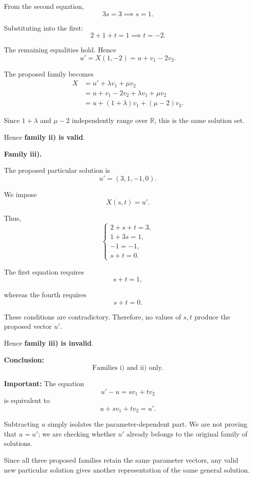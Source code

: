 \begin{enumerate}[label=\alph*)]
\begin{answer}
    From the second equation,
    $$
    3s=3
    \implies s=1.
    $$

    Substituting into the first:
    $$
    2+1+t=1
    \implies t=-2.
    $$

    The remaining equalities hold.
    Hence
    $$
    u'=X(1,-2)=u+v_1-2v_2.
    $$

    The proposed family becomes
    $$
    \begin{aligned}
    X
    &=u'+\lambda v_1+\mu v_2\\
    &=u+v_1-2v_2
      +\lambda v_1+\mu v_2\\
    &=u+(1+\lambda)v_1
      +(\mu-2)v_2.
    \end{aligned}
    $$

    Since $1+\lambda$ and $\mu-2$ independently range over $\mathbb{R}$, this is the same
    solution set.

    Hence \textbf{family ii) is valid}.

    \textbf{Family iii).}

    The proposed particular solution is
    $$
    u'=(3,1,-1,0).
    $$

    We impose
    $$
    X(s,t)=u'.
    $$

    Thus,
    $$
    \begin{cases}
    2+s+t=3,\\
    1+3s=1,\\
    -1=-1,\\
    s+t=0.
    \end{cases}
    $$

    The first equation requires
    $$
    s+t=1,
    $$

    whereas the fourth requires
    $$
    s+t=0.
    $$

    These conditions are contradictory.
    Therefore, no values of $s,t$ produce the proposed vector $u'$.

    Hence \textbf{family iii) is invalid}.

    \textbf{Conclusion:}
    $$
    \boxed{\text{Families i) and ii) only.}}
    $$

    {\color{red}
    \textbf{Important:} The equation
    $$
    u'-u=sv_1+tv_2
    $$
    is equivalent to
    $$
    u+sv_1+tv_2=u'.
    $$

    Subtracting $u$ simply isolates the parameter-dependent part.
    We are not proving that $u=u'$; we are checking whether $u'$ already belongs to the original
    family of solutions.

    Since all three proposed families retain the same parameter vectors,
    any valid new particular solution gives another representation of the same general solution.
    }
\end{answer}


\end{enumerate}
